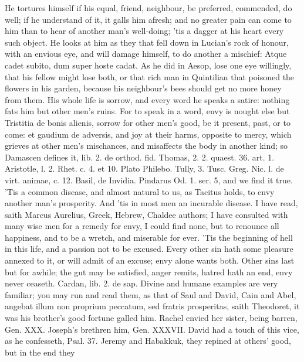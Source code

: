 {He tortures himself if his equal, friend, neighbour, be preferred,
commended, do well; if he understand of it, it galls him afresh; and no
greater pain can come to him than to hear of another man's well-doing;
'tis a dagger at his heart every such object. He looks at him as they
that fell down in Lucian's rock of honour, with an envious eye, and
will damage himself, to do another a mischief: Atque cadet subito, dum
super hoste cadat. As he did in Aesop, lose one eye willingly, that his
fellow might lose both, or that rich man in Quintilian that
poisoned the flowers in his garden, because his neighbour's bees should
get no more honey from them. His whole life is sorrow, and every word
he speaks a satire: nothing fats him but other men's ruins. For to
speak in a word, envy is nought else but Tristitia de bonis alienis,
sorrow for other men's good, be it present, past, or to come: et
gaudium de adversis, and joy at their harms, opposite to mercy,
which grieves at other men's mischances, and misaffects the body
in another kind; so Damascen defines it, lib. 2. de orthod. fid.
Thomas, 2. 2. quaest. 36. art. 1. Aristotle, l. 2. Rhet. c. 4. et 10.
Plato Philebo. Tully, 3. Tusc. Greg. Nic. l. de virt. animae, c. 12.
Basil, de Invidia. Pindarus Od. 1. ser. 5, and we find it true. 'Tis a
common disease, and almost natural to us, as Tacitus holds, to
envy another man's prosperity. And 'tis in most men an incurable
disease. I have read, saith Marcus Aurelius, Greek, Hebrew,
Chaldee authors; I have consulted with many wise men for a remedy for
envy, I could find none, but to renounce all happiness, and to be a
wretch, and miserable for ever. 'Tis the beginning of hell in this
life, and a passion not to be excused. Every other sin hath some
pleasure annexed to it, or will admit of an excuse; envy alone wants
both. Other sins last but for awhile; the gut may be satisfied, anger
remits, hatred hath an end, envy never ceaseth. Cardan, lib. 2. de sap.
Divine and humane examples are very familiar; you may run and read
them, as that of Saul and David, Cain and Abel, angebat illum non
proprium peccatum, sed fratris prosperitas, saith Theodoret, it was his
brother's good fortune galled him. Rachel envied her sister, being
barren, Gen. XXX. Joseph's brethren him, Gen. XXXVII. David had a touch
of this vice, as he confesseth, Psal. 37. Jeremy and
Habakkuk, they repined at others' good, but in the end they
}

